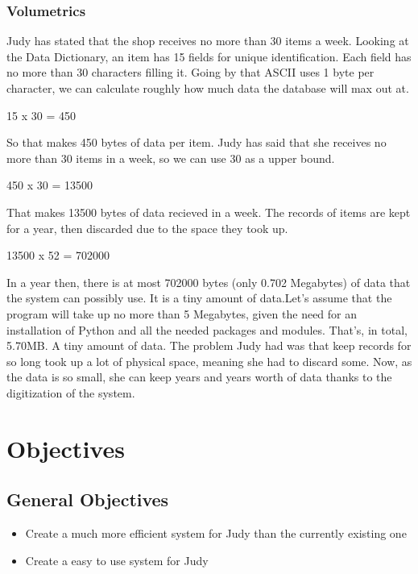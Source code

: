 \subsubsection{Volumetrics}
Judy has stated that the shop receives no more than 30 items a week. Looking at the Data Dictionary, an item has 15 fields for unique identification. Each field has no more than 30 characters filling it. Going by that ASCII uses 1 byte per character, we can calculate roughly how much data the database will max out at.

15 x 30 = 450

So that makes 450 bytes of data per item. Judy has said that she receives no more than 30 items in a week, so we can use 30 as a upper bound.

450 x 30 = 13500

That makes 13500 bytes of data recieved in a week. The records of items are kept for a year, then discarded due to the space they took up.

13500 x 52 = 702000

In a year then, there is at most 702000 bytes (only 0.702 Megabytes) of data that the system can possibly use. It is a tiny amount of data.Let’s assume that the program will take up no more than 5 Megabytes, given the need for an installation of Python and all the needed packages and modules.
That’s, in total, 5.70MB. A tiny amount of data. The problem Judy had was that keep records for so long took up a lot of physical space, meaning she had to discard some. Now, as the data is so small, she can keep years and years worth of data thanks to the digitization of the system.

\section{Objectives}

\subsection{General Objectives}
\begin{itemize}
    \item Create a much more efficient system for Judy than the currently existing one
    \item Create a easy to use system for Judy
\end{itemize}
